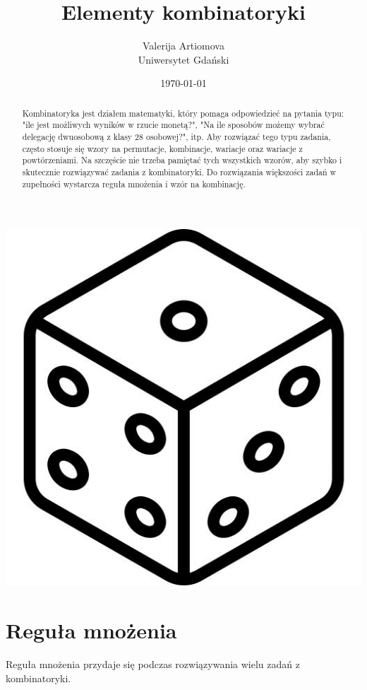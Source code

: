\documentclass[polish,10pt]{article}
\title{Elementy kombinatoryki}
\author{Valerija Artiomova \\
	Uniwersytet Gdański}
\date{\today}
\begin{document}
\nocite{*}
\begin{titlepage}
\maketitle

\begin{abstract}
Kombinatoryka jest działem matematyki, który pomaga odpowiedzieć na pytania typu: "ile jest możliwych wyników w rzucie monetą?", "Na ile sposobów możemy wybrać delegację dwuosobową z klasy 28 osobowej?", itp.
Aby rozwiązać tego typu zadania, często stosuje się wzory na permutacje, kombinacje, wariacje oraz wariacje z powtórzeniami.
Na szczęście nie trzeba pamiętać tych wszystkich wzorów, aby szybko i skutecznie rozwiązywać zadania z kombinatoryki.
Do rozwiązania większości zadań w zupełności wystarcza reguła mnożenia i wzór na kombinację.
\end{abstract}
\begin{center}
\includegraphics[scale=0.2, ]{images/cube.jpeg}
\end{center}
\end{titlepage}


\section{Reguła mnożenia}
Reguła mnożenia przydaje się podczas rozwiązywania wielu zadań z kombinatoryki.\cite{RM}
\end{document}
